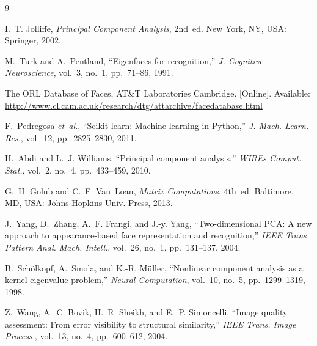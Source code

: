 \documentclass[journal]{IEEEtran}
\begin{document}
\begin{thebibliography}{9}
\label{sec:refs}

I.~T. Jolliffe, \emph{Principal Component Analysis}, 2nd~ed.
New York, NY, USA: Springer, 2002.

M.~Turk and A.~Pentland, ``Eigenfaces for recognition,'' \emph{J. Cognitive
Neuroscience}, vol.~3, no.~1, pp.~71--86, 1991.

The ORL Database of Faces, AT\&T Laboratories Cambridge. [Online]. Available:
\url{http://www.cl.cam.ac.uk/research/dtg/attarchive/facedatabase.html}

F.~Pedregosa \emph{et~al.}, ``Scikit-learn: Machine learning in Python,''
\emph{J. Mach. Learn. Res.}, vol.~12, pp.~2825--2830, 2011.

H.~Abdi and L.~J. Williams, ``Principal component analysis,'' \emph{WIREs
Comput. Stat.}, vol.~2, no.~4, pp.~433--459, 2010.

G.~H. Golub and C.~F. Van~Loan, \emph{Matrix Computations}, 4th~ed.
Baltimore, MD, USA: Johns Hopkins Univ. Press, 2013.

J.~Yang, D.~Zhang, A.~F. Frangi, and J.-y. Yang, ``Two-dimensional PCA: A new
approach to appearance-based face representation and recognition,'' \emph{IEEE
Trans. Pattern Anal. Mach. Intell.}, vol.~26, no.~1, pp.~131--137, 2004.

B.~Sch\"olkopf, A.~Smola, and K.-R. M\"uller, ``Nonlinear component analysis
as a kernel eigenvalue problem,'' \emph{Neural Computation}, vol.~10, no.~5,
pp.~1299--1319, 1998.

Z.~Wang, A.~C. Bovik, H.~R. Sheikh, and E.~P. Simoncelli, ``Image quality
assessment: From error visibility to structural similarity,'' \emph{IEEE
Trans. Image Process.}, vol.~13, no.~4, pp.~600--612, 2004.

\end{thebibliography}
\end{document}
